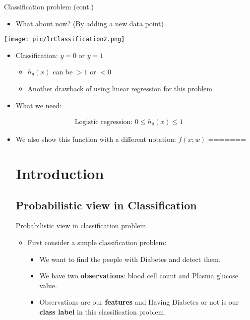 \documentclass[serif, aspectratio=169]{beamer}
\begin{document}
\begin{frame}{Classification problem (cont.)}
    \begin{itemize}
        \item What about now? (By adding a new data point)
    \end{itemize}
    
    \centering
    \texttt{[image: pic/lrClassification2.png]}
    
    \begin{itemize}
        \item Classification: $y=0$ or $y=1$
            \begin{itemize}
                \item $h_ \theta(x)$ can be $>1$ or $<0$
                \item Another drawback of using linear regression for this problem
            \end{itemize}
        \item What we need:
    \end{itemize}
    \begin{align*}
        \text{Logistic regression:  } 0 \leq h_\theta (x) \leq 1
    \end{align*}
    \begin{itemize}
        \item We also show this function with a different notation: $f(x;w)$
=======
\section{Introduction}
\subsection{Probabilistic view in Classification}

\begin{frame}{Probabilistic view in classification problem}
    \begin{itemize}
        \item First consider a simple classification problem:
            \begin{itemize}
                \item We want to find the people with Diabetes and detect them.
                \item We have two \textbf{observations}: blood cell count and Plasma glucose value.
                \item Observations are our \textbf{features} and Having Diabetes or not is our \textbf{class label} in this classification problem.
            \end{itemize}
    \end{itemize}
    

\end{frame}
\end{itemize}
\end{frame}
\end{document}
